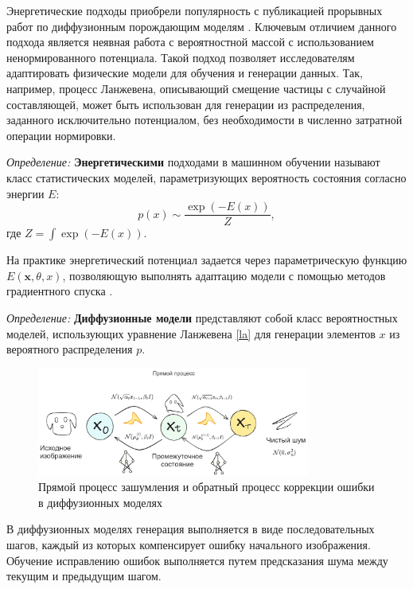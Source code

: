 Энергетические подходы приобрели популярность с публикацией прорывных работ по диффузионным порождающим 
моделям \cite{song2020score}. Ключевым отличием данного подхода является неявная работа с вероятностной
массой с использованием ненормированного потенциала. Такой подход позволяет исследователям адаптировать
физические модели для обучения и генерации данных. Так, например, процесс Ланжевена, описывающий
смещение частицы с случайной составляющей, может быть использован для генерации из распределения, заданного
исключительно потенциалом, без необходимости в численно затратной операции нормировки.

\textit{Определение:} \textbf{Энергетическими} подходами в машинном обучении 
называют класс статистических моделей, параметризующих вероятность 
состояния согласно энергии $E$:
\begin{equation}
    p(x) \sim \frac{\exp(-E(x))}{Z},
\end{equation}
где $Z=\int \exp(-E(x))$. 

На практике энергетический потенциал задается через параметрическую функцию $E(\mathbf{x},\theta,x)$, позволяющую
выполнять адаптацию модели с помощью методов градиентного спуска \cite{lecun2006tutorial}.

\textit{Определение:} \textbf{Диффузионные модели} \label{diffusion} представляют собой класс вероятностных моделей, 
использующих уравнение Ланжевена \ref{la} для генерации элементов $x$ из вероятного распределения $p$.

\begin{figure}[h]
    \centering
    \includegraphics[width=0.8\textwidth]{assets/ml/generation/diffusion.excalidraw.png}
    \caption{Прямой процесс зашумления и обратный процесс коррекции ошибки в диффузионных моделях}
    \label{sd_arch}
\end{figure}

В диффузионных моделях генерация выполняется в виде последовательных шагов, каждый из которых 
компенсирует ошибку начального изображения. Обучение исправлению ошибок выполняется путем предсказания 
шума между текущим и предыдущим шагом.

